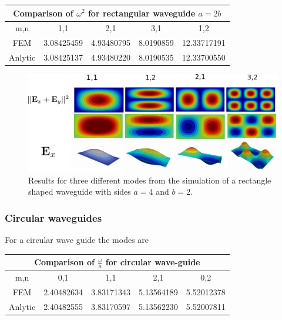 \begin{center}
\begin{tabular}{|c|c|c|c|c|}
\hline
\multicolumn{5}{|c|}{Comparison of $\omega^2$ for rectangular waveguide $a =2b$} \\
\hline 
m,n & 1,1 & 2,1 & 3,1 & 1,2 \\ 
\hline 
FEM     & 3.08425459 & 4.93480795 & 8.0190859 & 12.33717191 \\ 
\hline 
Anlytic & 3.08425137 & 4.93480220 & 8.0190535 & 12.33700550 \\ 
\hline 
\end{tabular} 
\label{tab:rec_wav_comparison}
\end{center}
\begin{figure}
\centering
\includegraphics[scale=0.1]{./img/rectangular_waveguide.pdf}
\caption{Results for three different modes from the simulation of a rectangle shaped waveguide with sides $a=4$ and $b=2$.}
\label{fig:rectangular_waveguide}
\end{figure}


\subsubsection{Circular waveguides}

For a circular wave guide the modes are 

\begin{center}
\begin{tabular}{|c|c|c|c|c|}
\hline
\multicolumn{5}{|c|}{Comparison of $\frac{\omega}{a}$ for circular wave-guide} \\
\hline 
m,n & 0,1 & 1,1 & 2,1 & 0,2 \\ 
\hline 
FEM     & 2.40482634 & 3.83171343 & 5.13564189 & 5.52012378 \\ 
\hline 
Anlytic & 2.40482555 & 3.83170597 & 5.13562230 & 5.52007811 \\ 
\hline 
\end{tabular} 
\label{tab:cir_wav_comparison}
\end{center}

